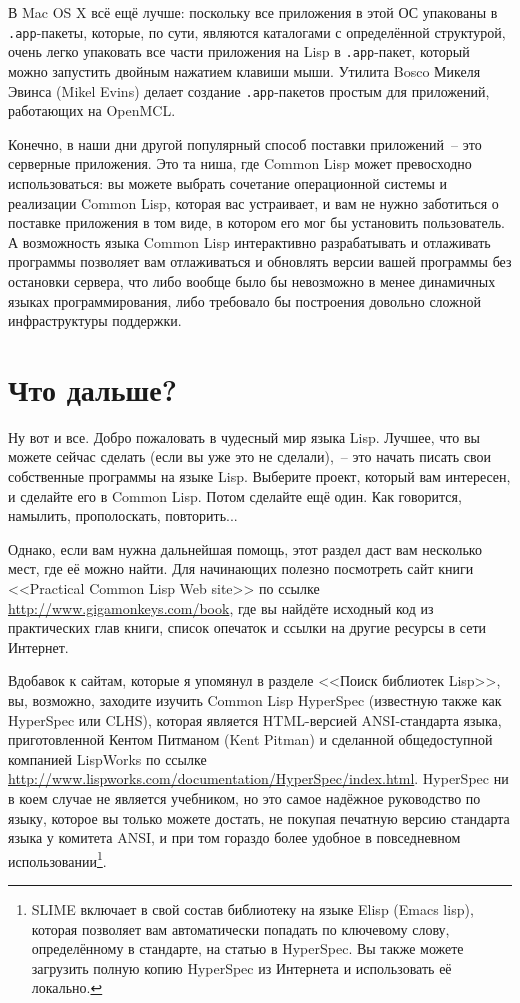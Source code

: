 В Mac OS X всё ещё лучше: поскольку все приложения в этой ОС упакованы в \texttt{.app}-пакеты,
которые, по сути, являются каталогами с определённой структурой, очень легко упаковать все
части приложения на Lisp в \texttt{.app}-пакет, который можно запустить двойным нажатием клавиши
мыши. Утилита Bosco Микеля Эвинса (Mikel Evins) делает создание \texttt{.app}-пакетов простым для
приложений, работающих на OpenMCL.

Конечно, в наши дни другой популярный способ поставки приложений~-- это серверные
приложения. Это та ниша, где Common Lisp может превосходно использоваться: вы можете
выбрать сочетание операционной системы и реализации Common Lisp, которая вас устраивает, и
вам не нужно заботиться о поставке приложения в том виде, в котором его мог бы установить
пользователь. А возможность языка Common Lisp интерактивно разрабатывать и отлаживать
программы позволяет вам отлаживаться и обновлять версии вашей программы без остановки
сервера, что либо вообще было бы невозможно в менее динамичных языках программирования,
либо требовало бы построения довольно сложной инфраструктуры поддержки.

\section{Что дальше?}

Ну вот и все. Добро пожаловать в чудесный мир языка Lisp. Лучшее, что вы можете сейчас
сделать (если вы уже это не сделали),~-- это начать писать свои собственные программы на
языке Lisp. Выберите проект, который вам интересен, и сделайте его в Common Lisp. Потом
сделайте ещё один. Как говорится, намылить, прополоскать, повторить...

Однако, если вам нужна дальнейшая помощь, этот раздел даст вам несколько мест, где её
можно найти. Для начинающих полезно посмотреть сайт книги <<Practical Common Lisp Web
site>> по ссылке \url{http://www.gigamonkeys.com/book}, где вы найдёте исходный код из
практических глав книги, список опечаток и ссылки на другие ресурсы в сети Интернет.

Вдобавок к сайтам, которые я упомянул в разделе <<Поиск библиотек Lisp>>, вы, возможно,
заходите изучить Common Lisp HyperSpec (известную также как HyperSpec или CLHS), которая
является HTML-версией ANSI-стандарта языка, приготовленной Кентом Питманом (Kent Pitman) и
сделанной общедоступной компанией LispWorks по ссылке
\url{http://www.lispworks.com/documentation/HyperSpec/index.html}. HyperSpec ни в коем
случае не является учебником, но это самое надёжное руководство по языку, которое вы
только можете достать, не покупая печатную версию стандарта языка у комитета ANSI, и при
том гораздо более удобное в повседневном использовании\footnote{SLIME включает в свой
  состав библиотеку на языке Elisp (Emacs lisp), которая позволяет вам автоматически
  попадать по ключевому слову, определённому в стандарте, на статью в HyperSpec. Вы также
  можете загрузить полную копию HyperSpec из Интернета и использовать её локально.}.


